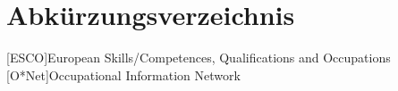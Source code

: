 \renewcommand{\chaptermark}[1]{\markboth{\spacedlowsmallcaps{#1}}{\spacedlowsmallcaps{#1}}}
\renewcommand{\sectionmark}[1]{\markright{\thesection\enspace\spacedlowsmallcaps{#1}}}
\chapter*{Abk\"{u}rzungsverzeichnis}

\begin{acronym}[UML]
  [ESCO]{European Skills/Competences, Qualifications and Occupations}
  [O*Net]{Occupational Information Network}
\end{acronym}

\cleardoublepage
